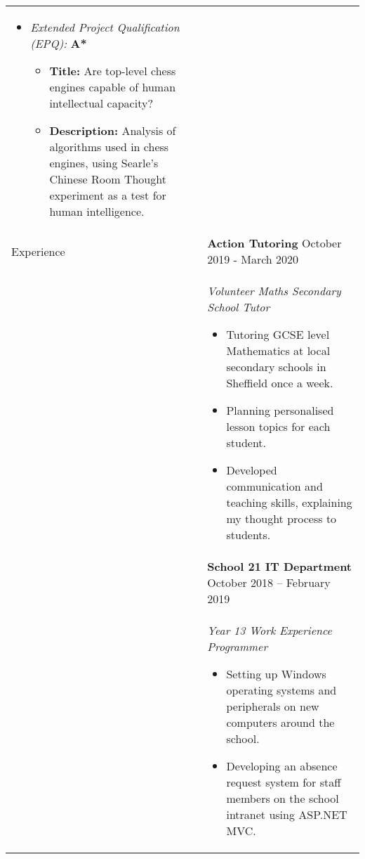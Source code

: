 \documentclass[11pt]{article}
\begin{document}
\begin{minipage}[t][0pt]{\linewidth}
\begin{tabular}[t]{p{2cm} p{14cm}}
	    \begin{itemize}
    		\renewcommand{\labelitemi}{$\diamond$}
        	    \item \textit{Extended Project Qualification (EPQ):} \hfill \textbf{A*} 
        	    \begin{itemize}
    				\renewcommand{\labelitemii}{$\cdot$}
        			\item \textbf{Title:} Are top-level chess engines capable of human intellectual capacity?
        			\item \textbf{Description:} Analysis of algorithms used in chess engines, using Searle's Chinese Room Thought experiment as a test for human intelligence.
			    \end{itemize}
		\end{itemize} \\
	{Experience} &
		\textbf{Action Tutoring}  \hfill October 2019 - March 2020 \\ &
		\textit{Volunteer Maths Secondary School Tutor}
		\begin{itemize}
			\renewcommand{\labelitemi}{$\diamond$}
			\item Tutoring GCSE level Mathematics at local secondary schools in Sheffield once a week. 
			\item Planning personalised lesson topics for each student.
			\item Developed communication and teaching skills, explaining my thought process to students. 
		\end{itemize} \\ &
		
    	\textbf{School 21 IT Department}  \hfill October 2018 – February 2019 \\ &
		\textit{Year 13 Work Experience Programmer}
		\begin{itemize}
			\renewcommand{\labelitemi}{$\diamond$}
			\item Setting up Windows operating systems and peripherals on new computers around the school.
			\item Developing an absence request system for staff members on the school intranet using ASP.NET MVC.
		\end{itemize} \\

\end{tabular}
\end{minipage}

\pagebreak
\end{document}
